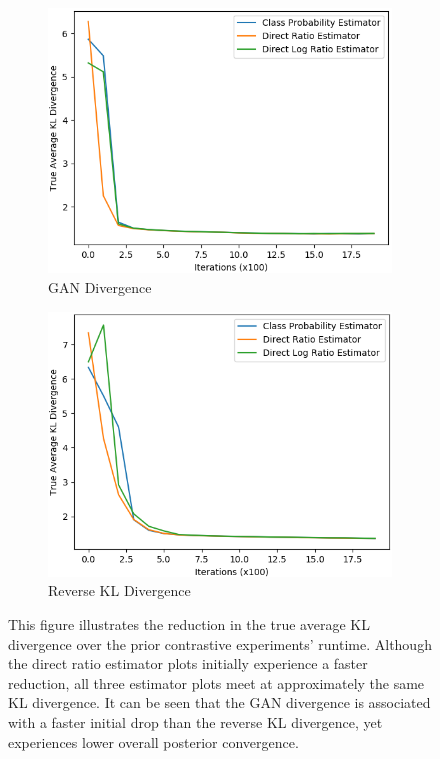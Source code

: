 \documentclass[honours,12pt]{unswthesis}
\numberwithin{equation}{section}
\theoremstyle{definition}
\begin{document}
\begin{figure}[h]
\begin{subfigure}{0.49\textwidth}
\includegraphics[width=\linewidth]{part2truklmins/PCADVvsPCADVexpvsPCADVgudlog.png}
\caption{GAN Divergence}
\end{subfigure}
\begin{subfigure}{0.49\textwidth}
\includegraphics[width=\linewidth]{part2truklmins/PCKLDvsPCKLexpvsPCKLgudlog.png}
\caption{Reverse KL Divergence}
\end{subfigure}
\caption{\small This figure illustrates the reduction in the true average KL divergence over the prior contrastive experiments' runtime. Although the direct ratio estimator plots initially experience a faster reduction, all three estimator plots meet at approximately the same KL divergence. It can be seen that the GAN divergence is associated with a faster initial drop than the reverse KL divergence, yet experiences lower overall posterior convergence.}
\end{figure}
\end{document}
